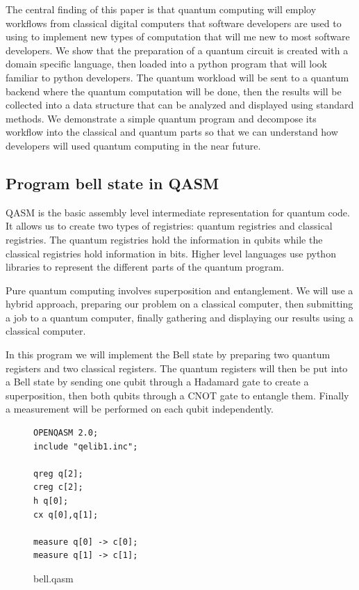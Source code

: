 \documentclass{article}
\begin{document}
The central finding of this paper is that quantum computing will employ workflows from classical digital computers that software developers are used to using to implement new types of computation that will me new to most software developers. We show that the preparation of a quantum circuit is created with a domain specific language, then loaded into a python program that will look familiar to python developers. The quantum workload will be sent to a quantum backend where the quantum computation will be done, then the results will be collected into a data structure that can be analyzed and displayed using standard methods. We demonstrate a simple quantum program and decompose its workflow into the classical and quantum parts so that we can understand how developers will used quantum computing in the near future.

\subsection{Program bell state in QASM}

QASM is the basic assembly level intermediate representation for quantum code. It allows us to create two types of registries: quantum registries and classical registries. The quantum registries hold the information in qubits while the classical registries hold information in bits. Higher level languages use python libraries to represent the different parts of the quantum program.

Pure quantum computing involves superposition and entanglement. We will use a hybrid approach, preparing our problem on a classical computer, then submitting a job to a quantum computer, finally gathering and displaying our results using a classical computer. 

In this program we will implement the Bell state by preparing two quantum registers and two classical registers. The quantum registers will then be put into a Bell state by sending one qubit through a Hadamard gate to create a superposition, then both qubits through a CNOT gate to entangle them. Finally a measurement will be performed on each qubit independently. 
\begin{samepage}
\begin{figure}[H]
\begin{verbatim}
OPENQASM 2.0;
include "qelib1.inc";

qreg q[2];
creg c[2];
h q[0];
cx q[0],q[1];
  
measure q[0] -> c[0];
measure q[1] -> c[1];
\end{verbatim}
\caption{bell.qasm}
\end{figure}
\end{samepage}
\end{document}
